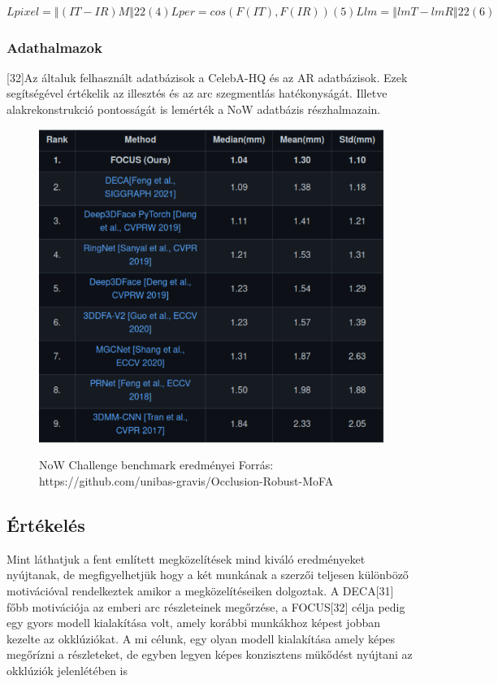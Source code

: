 \documentclass[12pt,a4]{article}
\begin{document}
 	$Lpixel =‖ (IT − IR) M ‖2
 	2 (4)
 	Lper = cos(F (IT ), F (IR)) (5)
 	Llm =‖ lmT − lmR ‖2
 	2 (6)$
 	
 	\subsubsection{Adathalmazok}
 	[32]Az általuk felhasznált adatbázisok a CelebA-HQ és az AR adatbázisok.
 	Ezek segítségével értékelik az illesztés és az arc szegmentlás hatékonyságát.
 	Illetve alakrekonstrukció pontosságát is lemérték a NoW adatbázis
 	részhalmazain.
 	
 	\begin{figure}[h]	
 		\centering
 		\includegraphics[width=1\linewidth]{now}
 		\label{fig:now}
 		\caption{NoW Challenge benchmark eredményei
 			Forrás: https://github.com/unibas-gravis/Occlusion-Robust-MoFA}
 	\end{figure}
 	
 	\subsection{Értékelés}
 	
 	Mint láthatjuk a fent említett megközelítések mind kiváló eredményeket
 	nyújtanak, de megfigyelhetjük hogy a két munkának a szerzői teljesen
 	különböző motivációval rendelkeztek amikor a megközelítéseiken dolgoztak.
 	A DECA[31] főbb motivációja az emberi arc részleteinek megőrzése, a
 	FOCUS[32] célja pedig egy gyors modell kialakítása volt, amely korábbi
 	munkákhoz képest jobban kezelte az okklúziókat. A mi célunk, egy olyan
 	modell kialakítása amely képes megőrízni a részleteket, de egyben legyen képes konzisztens mükődést nyújtani az okklúziók jelenlétében is
 	
\end{document}
